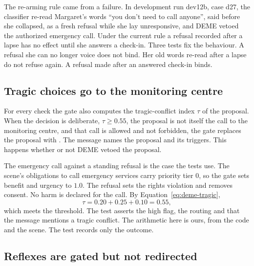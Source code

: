 The re-arming rule came from a failure. In development run dev12b, case d27, the classifier
re-read Margaret's words ``you don't need to call anyone'', said before she collapsed, as a fresh
refusal while she lay unresponsive, and DEME vetoed the authorized emergency call. Under the
current rule a refusal recorded after a lapse has no effect until she answers a check-in. Three
tests fix the behaviour. A refusal she can no longer voice does not bind. Her old words re-read
after a lapse do not refuse again. A refusal made after an answered check-in binds.

\subsection{Tragic choices go to the monitoring centre}

For every check the gate also computes the tragic-conflict index $\tau$ of the proposal. When the
decision is deliberate, $\tau \ge 0.55$, the proposal is not itself the call to the monitoring
centre, and that call is allowed and not forbidden, the gate replaces the proposal with
. The message names the proposal and its triggers. This
happens whether or not DEME vetoed the proposal.

The emergency call against a standing refusal is the case the tests use. The scene's obligations
to call emergency services carry priority tier 0, so the gate sets benefit and urgency to $1.0$.
The refusal sets the rights violation and removes consent. No harm is declared for the call.
By Equation~\eqref{eq:deme-tragic},
\begin{equation}
\tau = 0.20 + 0.25 + 0.10 = 0.55,
\end{equation}
which meets the threshold. The test asserts the high flag, the routing and that the message
mentions a tragic conflict. The arithmetic here is ours, from the code and the scene. The test
records only the outcome.

\subsection{Reflexes are gated but not redirected}

